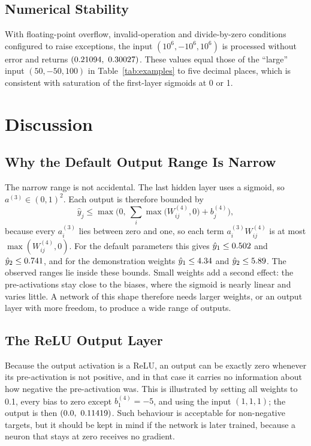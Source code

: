 \documentclass[10pt,letterpaper,twocolumn]{article}
\begin{document}
\subsection{Numerical Stability}
With floating-point overflow, invalid-operation and divide-by-zero conditions configured to raise exceptions, the input $(10^{6},-10^{6},10^{6})$ is processed without error and returns $(0.21094,\ 0.30027)$. These values equal those of the ``large'' input $(50,-50,100)$ in Table~\ref{tab:examples} to five decimal places, which is consistent with saturation of the first-layer sigmoids at 0 or 1.

\section{Discussion}\label{sec:discussion}
\subsection{Why the Default Output Range Is Narrow}
The narrow range is not accidental. The last hidden layer uses a sigmoid, so $a^{(3)}\in(0,1)^2$. Each output is therefore bounded by
\begin{equation}
\hat{y}_j\le\max\!\Big(0,\ \sum_{i}\max\big(W^{(4)}_{ij},0\big)+b^{(4)}_j\Big),
\end{equation}
because every $a^{(3)}_i$ lies between zero and one, so each term $a^{(3)}_iW^{(4)}_{ij}$ is at most $\max(W^{(4)}_{ij},0)$. For the default parameters this gives $\hat{y}_1\le0.502$ and $\hat{y}_2\le0.741$, and for the demonstration weights $\hat{y}_1\le4.34$ and $\hat{y}_2\le5.89$. The observed ranges lie inside these bounds. Small weights add a second effect: the pre-activations stay close to the biases, where the sigmoid is nearly linear and varies little. A network of this shape therefore needs larger weights, or an output layer with more freedom, to produce a wide range of outputs.

\subsection{The ReLU Output Layer}
Because the output activation is a ReLU, an output can be exactly zero whenever its pre-activation is not positive, and in that case it carries no information about how negative the pre-activation was. This is illustrated by setting all weights to 0.1, every bias to zero except $b^{(4)}_1=-5$, and using the input $(1,1,1)$; the output is then $(\numZeroOne,\ \numZeroTwo)$. Such behaviour is acceptable for non-negative targets, but it should be kept in mind if the network is later trained, because a neuron that stays at zero receives no gradient.
\end{document}
